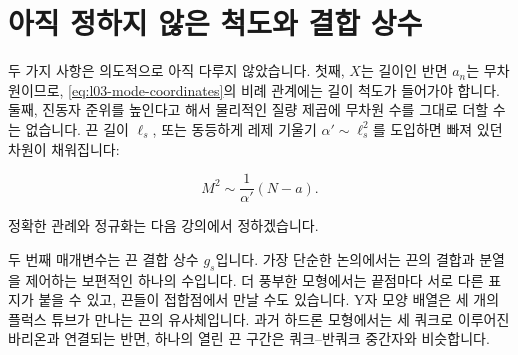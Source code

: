 \begin{classroomqa}
\end{classroomqa}

\begin{classroomqa}
\end{classroomqa}

\section{아직 정하지 않은 척도와 결합 상수}

두 가지 사항은 의도적으로 아직 다루지 않았습니다. 첫째, \(X\)는 길이인 반면 \(a_n\)는 무차원이므로, \eqref{eq:l03-mode-coordinates}의 비례 관계에는 길이 척도가 들어가야 합니다. 둘째, 진동자 준위를 높인다고 해서 물리적인 질량 제곱에 무차원 수를 그대로 더할 수는 없습니다. 끈 길이 \(\ell_s\), 또는 동등하게 레제 기울기 \(\alpha'\sim\ell_s^2\)를 도입하면 빠져 있던 차원이 채워집니다:

\begin{equation}
  M^2\sim\frac{1}{\alpha'}(N-a).
  \label{eq:l03-dimensional-spectrum}
\end{equation}

정확한 관례와 정규화는 다음 강의에서 정하겠습니다.

\begin{classroomqa}
\end{classroomqa}

두 번째 매개변수는 끈 결합 상수 \(g_s\)입니다. 가장 단순한 논의에서는 끈의 결합과 분열을 제어하는 보편적인 하나의 수입니다. 더 풍부한 모형에서는 끝점마다 서로 다른 표지가 붙을 수 있고, 끈들이 접합점에서 만날 수도 있습니다. Y자 모양 배열은 세 개의 플럭스 튜브가 만나는 끈의 유사체입니다. 과거 하드론 모형에서는 세 쿼크로 이루어진 바리온과 연결되는 반면, 하나의 열린 끈 구간은 쿼크--반쿼크 중간자와 비슷합니다.

